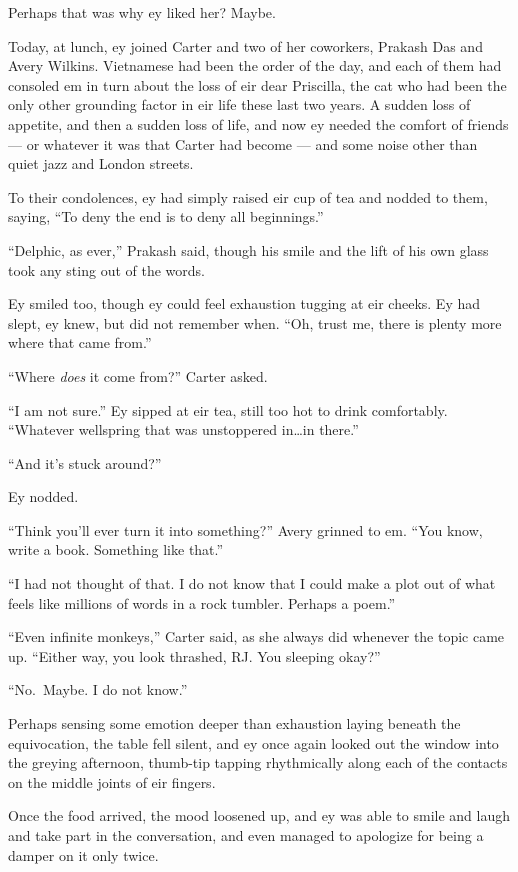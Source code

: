 Perhaps that was why ey liked her? Maybe.

Today, at lunch, ey joined Carter and two of her coworkers, Prakash Das and Avery Wilkins. Vietnamese had been the order of the day, and each of them had consoled em in turn about the loss of eir dear Priscilla, the cat who had been the only other grounding factor in eir life these last two years. A sudden loss of appetite, and then a sudden loss of life, and now ey needed the comfort of friends — or whatever it was that Carter had become — and some noise other than quiet jazz and London streets.

To their condolences, ey had simply raised eir cup of tea and nodded to them, saying, ``To deny the end is to deny all beginnings.''

``Delphic, as ever,'' Prakash said, though his smile and the lift of his own glass took any sting out of the words.

Ey smiled too, though ey could feel exhaustion tugging at eir cheeks. Ey had slept, ey knew, but did not remember when. ``Oh, trust me, there is plenty more where that came from.''

``Where \emph{does} it come from?'' Carter asked.

``I am not sure.'' Ey sipped at eir tea, still too hot to drink comfortably. ``Whatever wellspring that was unstoppered in\ldots in there.''

``And it's stuck around?''

Ey nodded.

``Think you'll ever turn it into something?'' Avery grinned to em. ``You know, write a book. Something like that.''

``I had not thought of that. I do not know that I could make a plot out of what feels like millions of words in a rock tumbler. Perhaps a poem.''

``Even infinite monkeys,'' Carter said, as she always did whenever the topic came up. ``Either way, you look thrashed, RJ. You sleeping okay?''

``No.~Maybe. I do not know.''

Perhaps sensing some emotion deeper than exhaustion laying beneath the equivocation, the table fell silent, and ey once again looked out the window into the greying afternoon, thumb-tip tapping rhythmically along each of the contacts on the middle joints of eir fingers.

Once the food arrived, the mood loosened up, and ey was able to smile and laugh and take part in the conversation, and even managed to apologize for being a damper on it only twice.


